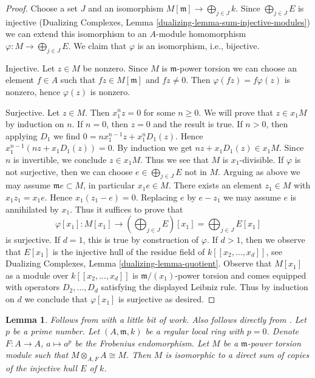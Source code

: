 \documentclass{stacks-project}
\newenvironment{reference}{\comment}{\endcomment}
\theoremstyle{plain}
\newtheorem{lemma}[subsection]{Lemma}
\theoremstyle{definition}
\theoremstyle{remark}
\numberwithin{equation}{subsection}
\begin{document}
\begin{proof}
Choose a set $J$ and an isomorphism $M[\mathfrak m] \to \bigoplus_{j \in J} k$.
Since $\bigoplus_{j \in J} E$ is injective
(Dualizing Complexes, Lemma \ref{dualizing-lemma-sum-injective-modules})
we can extend this isomorphism to an $A$-module homomorphism
$\varphi : M \to \bigoplus_{j \in J} E$.
We claim that $\varphi$ is an isomorphism, i.e., bijective.

\medskip\noindent
Injective. Let $z \in M$ be nonzero. Since $M$ is $\mathfrak m$-power torsion
we can choose an element $f \in A$ such that $fz \in M[\mathfrak m]$ and
$fz \not = 0$. Then $\varphi(fz) = f\varphi(z)$ is nonzero, hence
$\varphi(z)$ is nonzero.

\medskip\noindent
Surjective. Let $z \in M$. Then $x_1^n z = 0$ for some $n \geq 0$.
We will prove that $z \in x_1M$ by induction on $n$.
If $n = 0$, then $z = 0$ and the result is true.
If $n > 0$, then applying $D_1$ we find $0 = n x_1^{n - 1} z + x_1^nD_1(z)$.
Hence $x_1^{n - 1}(nz + x_1D_1(z)) = 0$. By induction we get
$nz + x_1D_1(z) \in x_1M$. Since $n$ is invertible, we conclude
$z \in x_1M$. Thus we see that $M$ is $x_1$-divisible.
If $\varphi$ is not surjective, then we can choose
$e \in \bigoplus_{j \in J} E$ not in $M$.
Arguing as above we may assume $\mathfrak m e \subset M$,
in particular $x_1 e \in M$. There exists an element
$z_1 \in M$ with $x_1 z_1 = x_1 e$. Hence
$x_1(z_1 - e) = 0$. Replacing $e$ by $e - z_1$
we may assume $e$ is annihilated by $x_1$.
Thus it suffices to prove that
$$
\varphi[x_1] :
M[x_1]
\longrightarrow
\left(\bigoplus\nolimits_{j \in J} E\right)[x_1] =
\bigoplus\nolimits_{j \in J} E[x_1]
$$
is surjective. If $d = 1$, this is true by construction of $\varphi$.
If $d > 1$, then we observe that $E[x_1]$ is the injective hull
of the residue field of $k[[x_2, \ldots, x_d]]$, see
Dualizing Complexes, Lemma \ref{dualizing-lemma-quotient}.
Observe that $M[x_1]$ as a module over $k[[x_2, \ldots, x_d]]$
is $\mathfrak m/(x_1)$-power torsion and comes
equipped with operators $D_2, \ldots, D_d$ satisfying
the displayed Leibniz rule.
Thus by induction on $d$ we conclude that $\varphi[x_1]$
is surjective as desired.
\end{proof}

\begin{lemma}
\label{lemma-structure-torsion-Frobenius-regular}
\begin{reference}
Follows from \cite[Corollary 3.6]{Huneke-Sharp} with a
little bit of work. Also follows directly from
\cite[Theorem 1.4]{Lyubeznik2}.
\end{reference}
Let $p$ be a prime number. Let $(A, \mathfrak m, k)$
be a regular local ring with $p = 0$. Denote $F : A \to A$, $a \mapsto a^p$
be the Frobenius endomorphism. Let $M$ be a $\mathfrak m$-power torsion module
such that $M \otimes_{A, F} A \cong M$. Then $M$ is isomorphic to a direct sum
of copies of the injective hull $E$ of $k$.
\end{lemma}
\end{document}
